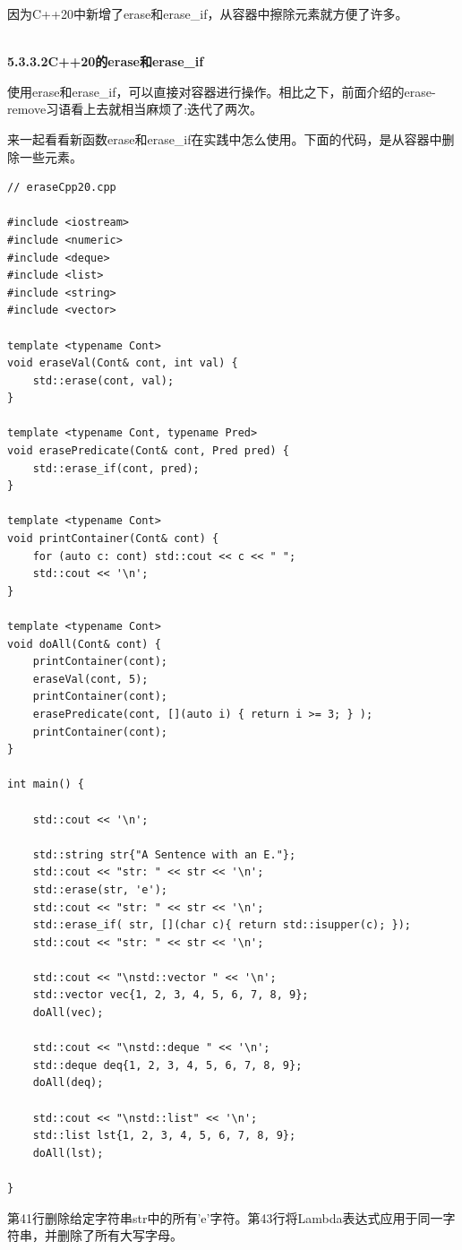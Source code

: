 因为C++20中新增了erase和erase\_if，从容器中擦除元素就方便了许多。

\hspace*{\fill} \\ %
\noindent
\textbf{5.3.3.2\hspace{0.2cm}C++20的erase和erase\_if}

使用erase和erase\_if，可以直接对容器进行操作。相比之下，前面介绍的erase-remove习语看上去就相当麻烦了:迭代了两次。

来一起看看新函数erase和erase\_if在实践中怎么使用。下面的代码，是从容器中删除一些元素。

\begin{lstlisting}[style=styleCXX]
// eraseCpp20.cpp

#include <iostream>
#include <numeric>
#include <deque>
#include <list>
#include <string>
#include <vector>

template <typename Cont>
void eraseVal(Cont& cont, int val) {
	std::erase(cont, val);
}

template <typename Cont, typename Pred>
void erasePredicate(Cont& cont, Pred pred) {
	std::erase_if(cont, pred);
}

template <typename Cont>
void printContainer(Cont& cont) {
	for (auto c: cont) std::cout << c << " ";
	std::cout << '\n';
}

template <typename Cont>
void doAll(Cont& cont) {
	printContainer(cont);
	eraseVal(cont, 5);
	printContainer(cont);
	erasePredicate(cont, [](auto i) { return i >= 3; } );
	printContainer(cont);
}

int main() {

	std::cout << '\n';
	
	std::string str{"A Sentence with an E."};
	std::cout << "str: " << str << '\n';
	std::erase(str, 'e');
	std::cout << "str: " << str << '\n';
	std::erase_if( str, [](char c){ return std::isupper(c); });
	std::cout << "str: " << str << '\n';
	
	std::cout << "\nstd::vector " << '\n';
	std::vector vec{1, 2, 3, 4, 5, 6, 7, 8, 9};
	doAll(vec);
	
	std::cout << "\nstd::deque " << '\n';
	std::deque deq{1, 2, 3, 4, 5, 6, 7, 8, 9};
	doAll(deq);
	
	std::cout << "\nstd::list" << '\n';
	std::list lst{1, 2, 3, 4, 5, 6, 7, 8, 9};
	doAll(lst);

}
\end{lstlisting}

第41行删除给定字符串str中的所有'e'字符。第43行将Lambda表达式应用于同一字符串，并删除了所有大写字母。

